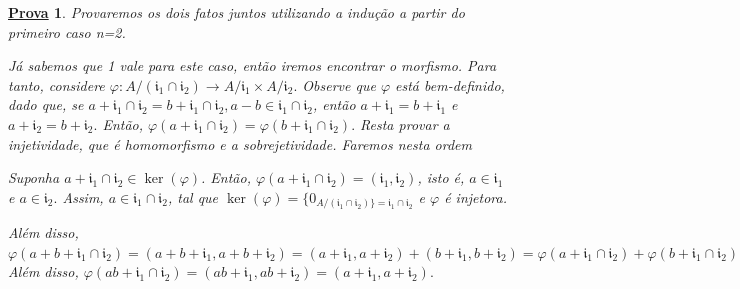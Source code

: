 \documentclass{article}
\newtheorem*{proof*}{\underline{Prova}}
\begin{document}
    \begin{proof*}
      Provaremos os dois fatos juntos utilizando a indução a partir do primeiro caso n=2. 

      Já sabemos que 1 vale para este caso, então iremos encontrar o morfismo. Para tanto, considere \(\varphi :A/(\mathfrak{i}_{1}\cap \mathfrak{i}_{2})\rightarrow A/\mathfrak{i}_{1}\times A/\mathfrak{i}_{2}.\)
      Observe que \(\varphi \) está bem-definido, dado que, se \(a+\mathfrak{i}_{1}\cap \mathfrak{i}_{2} = b + \mathfrak{i}_{1}\cap \mathfrak{i}_{2}, a-b\in \mathfrak{i}_{1}\cap \mathfrak{i}_2\), 
      então \(a+\mathfrak{i}_{1} = b + \mathfrak{i}_{1}\) e \(a + \mathfrak{i}_{2} = b + \mathfrak{i}_{2}.\) Então, \(\varphi(a+\mathfrak{i}_{1}\cap \mathfrak{i}_{2}) = \varphi(b+\mathfrak{i}_{1}\cap \mathfrak{i}_{2}).\)
      Resta provar a injetividade, que é homomorfismo e a sobrejetividade. Faremos nesta ordem

      Suponha \(a+\mathfrak{i}_{1}\cap \mathfrak{i}_{2}\in\ker{(\varphi )}\). Então, \(\varphi (a + \mathfrak{i}_{1}\cap \mathfrak{i}_{2}) = (\mathfrak{i}_{1}, \mathfrak{i}_{2})\),
      isto é, \(a\in \mathfrak{i}_{1}\) e \(a\in \mathfrak{i}_{2}.\) Assim, \(a\in \mathfrak{i}_{1}\cap \mathfrak{i}_{2}\), tal que \(\ker{(\varphi )} = \{0_{A/(\mathfrak{i}_{1}\cap \mathfrak{i}_{2})\} = \mathfrak{i}_{1}\cap \mathfrak{i}_{2}}\)
      e \(\varphi \) é injetora.

      Além disso, \(\varphi (a + b + \mathfrak{i}_{1}\cap \mathfrak{i}_{2}) = (a+b+\mathfrak{i}_{1}, a + b + \mathfrak{i}_{2}) =
      (a + \mathfrak{i}_{1}, a + \mathfrak{i}_{2}) + (b+\mathfrak{i}_{1}, b + \mathfrak{i}_{2}) = \varphi(a + \mathfrak{i}_{1}\cap \mathfrak{i}_{2}) + \varphi(b + \mathfrak{i}_{1}\cap \mathfrak{i}_{2}).\)
      Além disso, \(\varphi (ab + \mathfrak{i}_{1}\cap \mathfrak{i}_{2}) = (ab + \mathfrak{i}_{1}, ab+ \mathfrak{i}_{2}) = (a+\mathfrak{i}_{1}, a+\mathfrak{i}_{2}).\)


\end{proof*}
\end{document}
